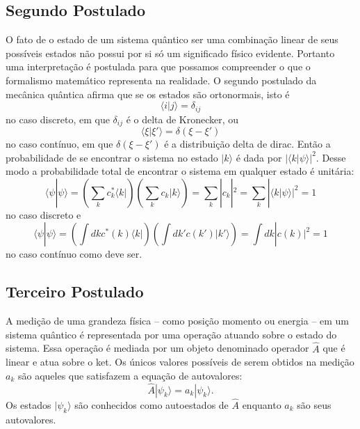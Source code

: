 \subsection{Segundo Postulado}

O fato de o estado de um sistema quântico ser uma combinação linear de seus possíveis estados não possui por si só um significado físico evidente. Portanto uma interpretação é postulada para que possamos compreender o que o formalismo matemático representa na realidade. O segundo postulado da mecânica quântica afirma que se os estados são ortonormais, isto é
\begin{equation}
\langle i | j \rangle = \delta_{ij}
\end{equation}
no caso discreto, em que $\delta_{ij}$ é o delta de Kronecker, ou
\begin{equation}
\langle \xi | \xi' \rangle = \delta(\xi-\xi')
\end{equation}
no caso contínuo, em que $\delta(\xi-\xi')$ é a distribuição delta de dirac. Então a probabilidade de se encontrar o sistema no estado $|k\rangle$ é dada por $|\langle k | \psi \rangle|^2$. Desse modo a probabilidade total de encontrar o sistema em qualquer estado é unitária:
\begin{equation}
\langle \psi | \psi \rangle = \left( \sum_k c_k^* \langle k | \right) \left( \sum_k c_k |k\rangle \right) = \sum_k |c_k|^2 = \sum_k |\langle k | \psi \rangle|^2 = 1
\end{equation}
no caso discreto e
\begin{equation}
\langle \psi | \psi \rangle = \left( \int dk c^*(k)\langle k | \right) \left( \int dk' c(k')|k'\rangle \right) = \int dk |c(k)|^2 = 1
\end{equation}
no caso contínuo como deve ser.

\subsection{Terceiro Postulado}

A medição de uma grandeza física – como posição momento ou energia – em um sistema quântico é representada por uma operação atuando sobre o estado do sistema. Essa operação é mediada por um objeto denominado operador $\hat{A}$ que é linear e atua sobre o ket. Os únicos valores possíveis de serem obtidos na medição $a_k$ são aqueles que satisfazem a equação de autovalores:
\begin{equation}
\hat{A} |\psi_k \rangle = a_k |\psi_k \rangle.
\end{equation}
Os estados $|\psi_k\rangle$ são conhecidos como autoestados de $\hat{A}$ enquanto $a_k$ são seus autovalores.

